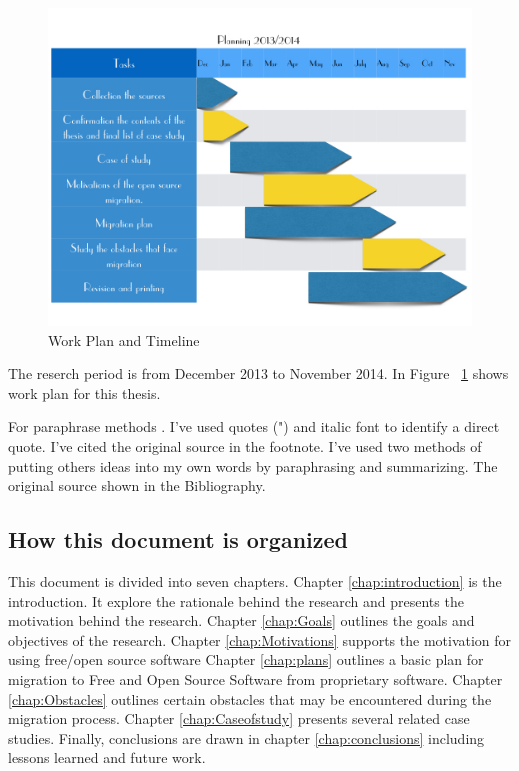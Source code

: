    \begin{figure}[H]
    \centering
        \includegraphics[scale=0.45]{img/planning.jpg}
      \caption{Work Plan and Timeline}
      \label{fig:planning}
    \end{figure}
The reserch period is from December 2013 to November 2014.
    In Figure ~\ref{fig:planning} shows work plan for this thesis.
 
 
 For paraphrase methods . I've used quotes (") and italic font to identify a direct quote. I've cited the original source in the footnote.
 I've used two methods of putting others ideas into my own words by paraphrasing and summarizing. The original source shown in the Bibliography.
\subsection{How this document is organized}
This document is divided into seven chapters. Chapter \ref{chap:introduction} is the introduction. It explore the rationale behind the research and presents the motivation behind the research. Chapter \ref{chap:Goals}  outlines the goals and objectives of the research. Chapter \ref{chap:Motivations} supports the motivation for using free/open source software Chapter \ref{chap:plans} outlines a basic plan for migration to Free and Open Source Software from proprietary software.  Chapter \ref{chap:Obstacles} outlines certain obstacles that may be encountered during the migration process. Chapter \ref{chap:Caseofstudy}  presents several related case studies. Finally, conclusions are drawn in chapter \ref{chap:conclusions} including lessons learned and future work.

